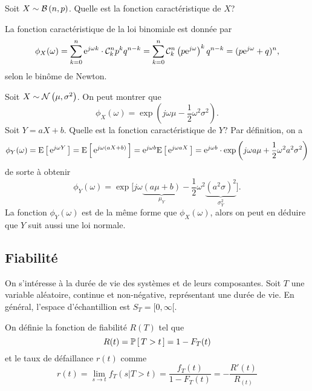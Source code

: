 \documentclass[11pt]{article}
\newcommand\comb[2]{%
	\ensuremath{%
		\mathcal{C}_{#2}^{#1}%
	}%
}%
\renewcommand\P[1]{%
	\ensuremath{%
		\mathbb{P}\left[\,#1\,\right]%
	}%
}%
\newcommand\e{%
	\ensuremath{%
		\mathrm{e}%
	}%
}%
\newcommand\Bin[2]{%
	\ensuremath{%
		\mathcal{B}\left(#1,#2\right)%
	}%
}%
\newcommand\Norm[2]{%
	\ensuremath{%
		\mathcal{N}\left(#1,#2\right)%
	}%
}%
\newcommand\Esp[1]{%
	\ensuremath{%
		\mathrm{E}\left[\,#1\,\right]%
	}%
}%
\begin{document}
\begin{exemple}
	Soit $X\sim\Bin{n}{p}$. Quelle est la fonction caractéristique de $X$?

	La fonction caractéristique de la loi binomiale est donnée par
	\begin{equation*}
		\phi_X(\omega)
		=\sum_{k=0}^n\e^{j\omega k}\cdot\comb{n}{k}p^kq^{n-k}
		=\sum_{k=0}^n\comb{n}{k}\left(p\e^{j\omega}\right)^kq^{n-k}
		=(p\e^{j\omega}+q)^n,
	\end{equation*}
	selon le binôme de Newton.
\end{exemple}

\pagebreak
\begin{exemple}
	Soit $X\sim\Norm{\mu}{\sigma^2}$. On peut montrer que
	\begin{equation*}
		\phi_X(\omega)=\exp\left(j\omega\mu-\frac{1}{2}\omega^2\sigma^2\right).
	\end{equation*}
	Soit $Y=aX+b$. Quelle est la fonction caractéristique de $Y$?
	Par définition, on a
	\begin{equation*}
		\phi_Y(\omega)
		=\Esp{\e^{j\omega Y}}
		=\Esp{\e^{j\omega(aX+b)}}
		=\e^{j\omega b}\Esp{\e^{j\omega aX}}
		=\e^{j\omega b}\cdot\exp\left(j\omega a\mu+\frac{1}{2}
			\omega^2a^2\sigma^2
		\right)
	\end{equation*}
	de sorte à obtenir
	\begin{equation*}
		\phi_Y(\omega)=
		\exp\bigg[
			j\omega\underbrace{(a\mu+b)}_{\mu_Y}-
			\frac{1}{2}\omega^2\underbrace{(a^2\sigma)^2}_{\sigma_Y^2}
		\bigg].
	\end{equation*}
	La fonction $\phi_Y(\omega)$ est de la même forme que $\phi_X(\omega)$,
	alors on peut en déduire que $Y$ suit aussi une loi normale.
\end{exemple}

\subsection{Fiabilité}
On s'intéresse à la durée de vie des systèmes et de leurs composantes. Soit $T$
une variable aléatoire, continue et non-négative, représentant une durée de
vie. En général, l'espace d'échantillion est $S_T=[0,\infty[$.

On définie la fonction de fiabilité $R(T)$ tel que
\begin{equation*}
	R(t)=\P{T>t}=1-F_T(t)
\end{equation*}
et le taux de défaillance $r(t)$ comme
\begin{equation*}
	r(t)
	=\lim_{s\rightarrow t}f_T(s|T>t)
	=\frac{f_T(t)}{1-F_T(t)}
	=-\frac{R\prime(t)}{R_(t)}
\end{equation*}
\end{document}
